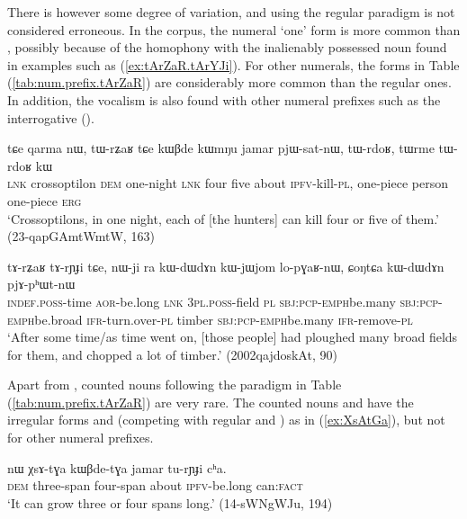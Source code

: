 There is however some degree of variation, and using the regular paradigm is not considered erroneous. In the corpus, the numeral `one' form  is more common than , possibly because of the homophony with the inalienably possessed noun  found in examples such as (\ref{ex:tArZaR.tArYJi}). For other numerals, the forms in Table (\ref{tab:num.prefix.tArZaR}) are considerably more common than the regular ones. In addition, the  vocalism is also found with other numeral prefixes such as the interrogative ().

\begin{exe}
\ex \label{ex:tWrZaR}
\gll tɕe qarma nɯ, tɯ-rʑaʁ tɕe kɯβde kɯmŋu jamar pjɯ-sat-nɯ, tɯ-rdoʁ, tɯrme tɯ-rdoʁ kɯ \\
\textsc{lnk} crossoptilon \textsc{dem} one-night \textsc{lnk} four five about \textsc{ipfv}-kill-\textsc{pl}, one-piece person one-piece \textsc{erg} \\
\glt `Crossoptilons, in one night, each of [the hunters] can kill four or five of them.' (23-qapGAmtWmtW, 163)
\end{exe}


\begin{exe}
\ex \label{ex:tArZaR.tArYJi}
\gll tɤ-rʑaʁ tɤ-rɲɟi tɕe, nɯ-ji ra kɯ-dɯ\redp{}dɤn kɯ-jɯ\redp{}jom lo-pɣaʁ-nɯ, ɕoŋtɕa kɯ-dɯ\redp{}dɤn pjɤ-pʰɯt-nɯ \\
\textsc{indef}.\textsc{poss}-time \textsc{aor}-be.long \textsc{lnk} \textsc{3pl}.\textsc{poss}-field \textsc{pl} \textsc{sbj}:\textsc{pcp}-\textsc{emph}\redp{}be.many \textsc{sbj}:\textsc{pcp}-\textsc{emph}\redp{}be.broad \textsc{ifr}-turn.over-\textsc{pl} timber \textsc{sbj}:\textsc{pcp}-\textsc{emph}\redp{}be.many \textsc{ifr}-remove-\textsc{pl} \\
\glt `After some time/as time went on, [those people] had ploughed many broad fields for them, and chopped a lot of timber.' (2002qajdoskAt, 90)
\end{exe}

Apart from  , counted nouns following the paradigm in Table (\ref{tab:num.prefix.tArZaR}) are very rare. The counted nouns  and  have the irregular forms  and  (competing with regular  and ) as in (\ref{ex:XsAtGa}), but not for other numeral prefixes. 

\begin{exe}
\ex \label{ex:XsAtGa}
\gll nɯ χsɤ-tɣa kɯβde-tɣa jamar tu-rɲɟi cʰa. \\
\textsc{dem} three-span four-span about \textsc{ipfv}-be.long can:\textsc{fact} \\
\glt `It can grow three or four spans long.' (14-sWNgWJu, 194)
\end{exe}

